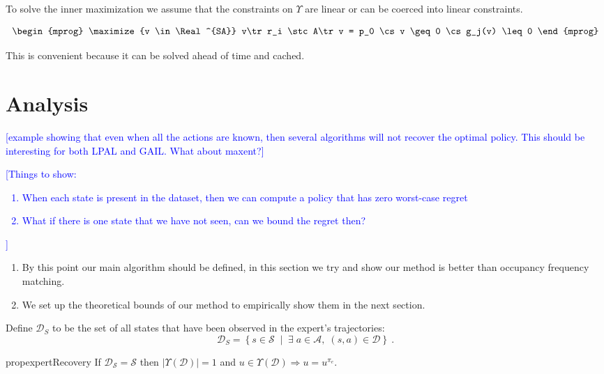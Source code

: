 \documentclass[11pt]{uai2023}
\newcommand{\mm}[1]{\textcolor{blue}{[#1]}}
\begin{document}
To solve the inner maximization we assume that the constraints on $\Upsilon$ are linear or can be coerced into linear constraints.

\begin{equation}
    \begin{mprog}
        \maximize{v \in \Real^{SA}} v\tr r_i
        \stc A\tr v = p_0
        \cs v \geq 0
        \cs g_j(v) \leq 0
    \end{mprog}
\end{equation}

This is convenient because it can be solved ahead of time and cached.

\section{Analysis}
\mm{example showing that even when all the actions are known, then several algorithms will not recover the optimal policy. This should be interesting for both LPAL and GAIL. What about maxent?}


\mm{Things to show:
	\begin{enumerate}
		\item When each state is present in the dataset, then we can compute a policy that has zero worst-case regret
		\item What if there is one state that we have not seen, can we bound the regret then?
	\end{enumerate}
}

\begin{enumerate}
	\item By this point our main algorithm should be defined, in this section we
	      try and show our method is better than occupancy frequency matching.
	\item We set up the theoretical bounds of our method to empirically show them
	      in the next section.
\end{enumerate}

Define $\mathcal{D}_S$ to be the set of all states that have been observed in the expert's trajectories:
\[
	\mathcal{D}_S  = \left\{ s\in \mathcal{S} \; \mid \; \exists\; a\in \mathcal{A}, \; (s,a) \in \mathcal{D} \right\}~.
\]



\begin{restatable}{prop}{expertRecovery}
    \label{expert_recovery}
    If $\mathcal{D}_\mathcal{S} = \mathcal{S}$ then $|\Upsilon(\mathcal{D})| = 1$
    and $u \in \Upsilon(\mathcal{D}) \Rightarrow u = u^{\pi_e}$.
\end{restatable}
\end{document}
